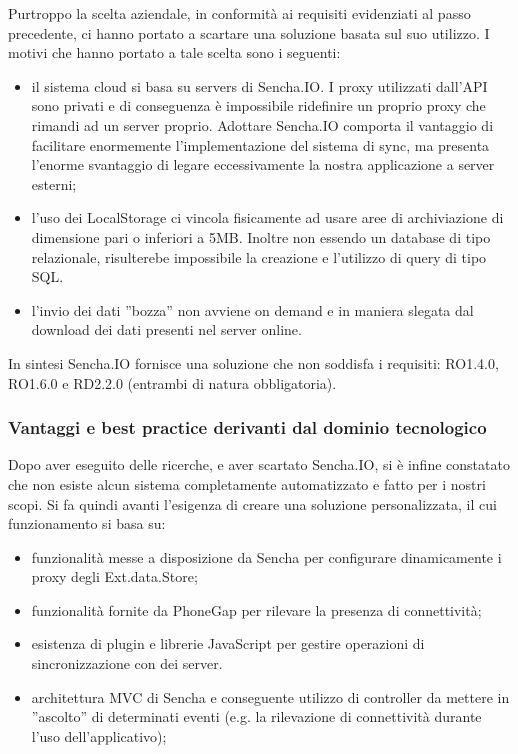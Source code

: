 \documentclass[10pt,a4paper,onecolumn]{article}
\begin{document}
Purtroppo la scelta aziendale, in conformità ai requisiti evidenziati al passo precedente, ci hanno portato a scartare una soluzione basata sul suo utilizzo. I motivi che hanno portato a tale scelta sono i seguenti:

\begin{itemize}
	\item il sistema cloud si basa su servers di Sencha.IO. I proxy utilizzati dall'API sono privati e di conseguenza è impossibile ridefinire un proprio proxy che rimandi ad un server proprio. Adottare Sencha.IO comporta il vantaggio di facilitare enormemente l'implementazione del sistema di sync, ma presenta l'enorme svantaggio di legare eccessivamente la nostra applicazione a server esterni;
	\item l'uso dei LocalStorage ci vincola fisicamente ad usare aree di archiviazione di dimensione pari o inferiori a 5MB. Inoltre non essendo un database di tipo relazionale, risulterebe impossibile la creazione e l'utilizzo di query di tipo SQL.
	\item l'invio dei dati ''bozza'' non avviene on demand e in maniera slegata dal download dei dati presenti nel server online.
\end{itemize}

In sintesi Sencha.IO fornisce una soluzione che non soddisfa i requisiti: RO1.4.0, RO1.6.0 e RD2.2.0 (entrambi di natura obbligatoria).

\subsubsection{Vantaggi e best practice derivanti dal dominio tecnologico}

Dopo aver eseguito delle ricerche, e aver scartato Sencha.IO, si è infine constatato che non esiste alcun sistema completamente automatizzato e fatto per i nostri scopi. Si fa quindi avanti l'esigenza di creare una soluzione personalizzata, il cui funzionamento si basa su:

\begin{itemize}
	\item funzionalità messe a disposizione da Sencha per configurare dinamicamente i proxy degli Ext.data.Store;
	\item funzionalità fornite da PhoneGap per rilevare la presenza di connettività;
	\item esistenza di plugin e librerie JavaScript per gestire operazioni di sincronizzazione con dei server.
	\item architettura MVC di Sencha e conseguente utilizzo di controller da mettere in ''ascolto'' di determinati eventi (e.g. la rilevazione di connettività durante l'uso dell'applicativo);
\end{itemize}
\end{document}
